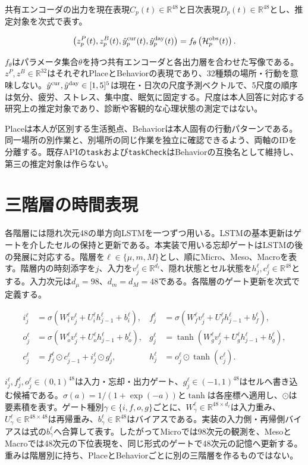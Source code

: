 共有エンコーダの出力を現在表現\(C_p(t)\in\mathbb R^{48}\)と日次表現\(D_p(t)\in\mathbb R^{48}\)とし、推定対象を次式で表す。

\[
\left(z_p^{P}(t),z_p^{B}(t),\hat y_p^{\rm cur}(t),\hat y_p^{\rm day}(t)\right)
=f_\theta\left(\mathcal H_p^{\rm obs}(t)\right).
\]

\(f_\theta\)はパラメータ集合\(\theta\)を持つ共有エンコーダと各出力層を合わせた写像である。\(z^P,z^B\in\mathbb R^{32}\)はそれぞれPlaceとBehaviorの表現であり、32種類の場所・行動を意味しない。\(\hat y^{\rm cur},\hat y^{\rm day}\in[1,5]^5\)は現在・日次の尺度予測ベクトルで、5尺度の順序は気分、疲労、ストレス、集中度、眠気に固定する。尺度は本人回答に対応する研究上の推定対象であり、診断や客観的な心理状態の測定ではない。

Placeは本人が区別する生活拠点、Behaviorは本人固有の行動パターンである。同一場所の別作業と、別場所の同じ作業を独立に確認できるよう、両軸のIDを分離する。既存APIの\texttt{task}および\texttt{taskCheck}はBehaviorの互換名として維持し、第三の推定対象は作らない。

\section{三階層の時間表現}

各階層には隠れ次元48の単方向LSTMを一つずつ用いる。LSTMの基本更新はゲートを介したセルの保持と更新である\autocite{hochreiter1997lstm}。本実装で用いる忘却ゲートはLSTMの後の発展に対応する\autocite{gers2000forget}。階層を\(\ell\in\{\mu,m,M\}\)とし、順にMicro、Meso、Macroを表す。階層内の時刻添字を\(j\)、入力を\(v_j^\ell\in\mathbb R^{d_\ell}\)、隠れ状態とセル状態を\(h_j^\ell,c_j^\ell\in\mathbb R^{48}\)とする。入力次元は\(d_\mu=98\)、\(d_m=d_M=48\)である。各階層のゲート更新を次式で定義する。

\[
\begin{aligned}
i_j^\ell&=\sigma(W_i^\ell v_j^\ell+U_i^\ell h_{j-1}^\ell+b_i^\ell),&
f_j^\ell&=\sigma(W_f^\ell v_j^\ell+U_f^\ell h_{j-1}^\ell+b_f^\ell),\\
o_j^\ell&=\sigma(W_o^\ell v_j^\ell+U_o^\ell h_{j-1}^\ell+b_o^\ell),&
g_j^\ell&=\tanh(W_g^\ell v_j^\ell+U_g^\ell h_{j-1}^\ell+b_g^\ell),\\
c_j^\ell&=f_j^\ell\odot c_{j-1}^\ell+i_j^\ell\odot g_j^\ell,&
h_j^\ell&=o_j^\ell\odot\tanh(c_j^\ell).
\end{aligned}
\]

\(i_j^\ell,f_j^\ell,o_j^\ell\in(0,1)^{48}\)は入力・忘却・出力ゲート、\(g_j^\ell\in(-1,1)^{48}\)はセルへ書き込む候補である。\(\sigma(a)=1/(1+\exp(-a))\)と\(\tanh\)は各座標へ適用し、\(\odot\)は要素積を表す。ゲート種別\(\gamma\in\{i,f,o,g\}\)ごとに、\(W_\gamma^\ell\in\mathbb R^{48\times d_\ell}\)は入力重み、\(U_\gamma^\ell\in\mathbb R^{48\times48}\)は再帰重み、\(b_\gamma^\ell\in\mathbb R^{48}\)はバイアスである。実装の入力側・再帰側バイアスは式の\(b_\gamma^\ell\)へ合算して表す。したがってMicroでは98次元の観測を、MesoとMacroでは48次元の下位表現を、同じ形式のゲートで48次元の記憶へ更新する。重みは階層別に持ち、PlaceとBehaviorごとに別の三階層を作るものではない。

